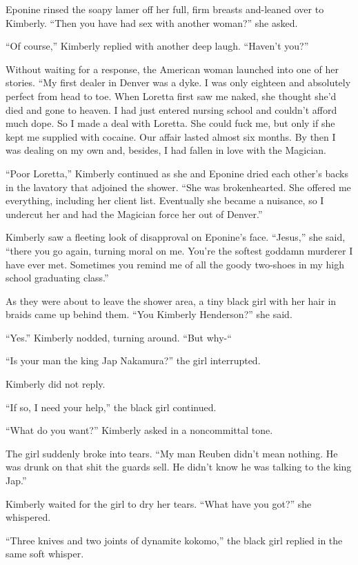 \documentclass[]{article}
\begin{document}
{Eponine rinsed the soapy lamer off her full, firm breasts and-leaned over to Kimberly. “Then you have had sex with another woman?” she asked.

“Of course,” Kimberly replied with another deep laugh. “Haven’t you?”

Without waiting for a response, the American woman launched into one of her stories. “My first dealer in Denver was a dyke. I was only eighteen and absolutely perfect from head to toe. When Loretta first saw me naked, she thought she’d died and gone to heaven. I had just entered nursing school and couldn’t afford much dope. So I made a deal with Loretta. She could fuck me, but only if she kept me supplied with cocaine. Our affair lasted almost six months. By then I was dealing on my own and, besides, I had fallen in love with the Magician.

“Poor Loretta,” Kimberly continued as she and Eponine dried each other’s backs in the lavatory that adjoined the shower. “She was brokenhearted. She offered me everything, including her client list. Eventually she became a nuisance, so I undercut her and had the Magician force her out of Denver.”

Kimberly saw a fleeting look of disapproval on Eponine’s face. “Jesus,” she said, “there you go again, turning moral on me. You’re the softest goddamn murderer I have ever met. Sometimes you remind me of all the goody two-shoes in my high school graduating class.”

As they were about to leave the shower area, a tiny black girl with her hair in braids came up behind them. “You Kimberly Henderson?” she said.

“Yes.” Kimberly nodded, turning around. “But why-“

“Is your man the king Jap Nakamura?” the girl interrupted.

Kimberly did not reply.

“If so, I need your help,” the black girl continued.

“What do you want?” Kimberly asked in a noncommittal tone.

The girl suddenly broke into tears. “My man Reuben didn’t mean nothing. He was drunk on that shit the guards sell. He didn’t know he was talking to the king Jap.”

Kimberly waited for the girl to dry her tears. “What have you got?” she whispered.

“Three knives and two joints of dynamite kokomo,” the black girl replied in the same soft whisper.

}
\end{document}
